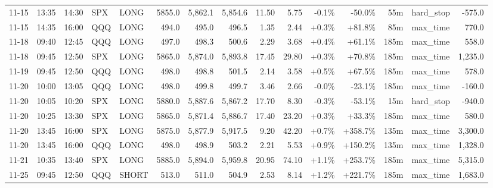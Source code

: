 \documentclass[11pt,a4paper,twoside]{article}
\begin{document}
\begin{landscape}
\begin{center}
\begin{longtable}{>{\color{txtmain}}l l l l l r r r r r r r r >{\color{txtmain}}l r}
11-15 & 13:35 & 14:30 & SPX & LONG & 5855.0 & 5,862.1 & 5,854.6 & 11.50 & 5.75 & \textcolor{lossred}{-0.1\%} & \textcolor{lossred}{-50.0\%} & 55m & hard\_stop & \textcolor{lossred}{-575.0} \\
11-15 & 14:35 & 16:00 & QQQ & LONG & 494.0 & 495.0 & 496.5 & 1.35 & 2.44 & \textcolor{wingreen}{+0.3\%} & \textcolor{wingreen}{+81.8\%} & 85m & max\_time & \textcolor{wingreen}{770.0} \\
11-18 & 09:40 & 12:45 & QQQ & LONG & 497.0 & 498.3 & 500.6 & 2.29 & 3.68 & \textcolor{wingreen}{+0.4\%} & \textcolor{wingreen}{+61.1\%} & 185m & max\_time & \textcolor{wingreen}{558.0} \\
11-18 & 09:45 & 12:50 & SPX & LONG & 5865.0 & 5,874.0 & 5,893.8 & 17.45 & 29.80 & \textcolor{wingreen}{+0.3\%} & \textcolor{wingreen}{+70.8\%} & 185m & max\_time & \textcolor{wingreen}{1,235.0} \\
11-19 & 09:45 & 12:50 & QQQ & LONG & 498.0 & 498.8 & 501.5 & 2.14 & 3.58 & \textcolor{wingreen}{+0.5\%} & \textcolor{wingreen}{+67.5\%} & 185m & max\_time & \textcolor{wingreen}{578.0} \\
11-20 & 10:00 & 13:05 & QQQ & LONG & 498.0 & 499.8 & 499.7 & 3.46 & 2.66 & \textcolor{lossred}{-0.0\%} & \textcolor{lossred}{-23.1\%} & 185m & max\_time & \textcolor{lossred}{-160.0} \\
11-20 & 10:05 & 10:20 & SPX & LONG & 5880.0 & 5,887.6 & 5,867.2 & 17.70 & 8.30 & \textcolor{lossred}{-0.3\%} & \textcolor{lossred}{-53.1\%} & 15m & hard\_stop & \textcolor{lossred}{-940.0} \\
11-20 & 10:25 & 13:30 & SPX & LONG & 5865.0 & 5,871.4 & 5,886.7 & 17.40 & 23.20 & \textcolor{wingreen}{+0.3\%} & \textcolor{wingreen}{+33.3\%} & 185m & max\_time & \textcolor{wingreen}{580.0} \\
11-20 & 13:45 & 16:00 & SPX & LONG & 5875.0 & 5,877.9 & 5,917.5 & 9.20 & 42.20 & \textcolor{wingreen}{+0.7\%} & \textcolor{wingreen}{+358.7\%} & 135m & max\_time & \textcolor{wingreen}{3,300.0} \\
11-20 & 13:45 & 16:00 & QQQ & LONG & 498.0 & 498.9 & 503.2 & 2.21 & 5.53 & \textcolor{wingreen}{+0.9\%} & \textcolor{wingreen}{+150.2\%} & 135m & max\_time & \textcolor{wingreen}{1,328.0} \\
11-21 & 10:35 & 13:40 & SPX & LONG & 5885.0 & 5,894.0 & 5,959.8 & 20.95 & 74.10 & \textcolor{wingreen}{+1.1\%} & \textcolor{wingreen}{+253.7\%} & 185m & max\_time & \textcolor{wingreen}{5,315.0} \\
11-25 & 09:45 & 12:50 & QQQ & SHORT & 513.0 & 511.0 & 504.9 & 2.53 & 8.14 & \textcolor{wingreen}{+1.2\%} & \textcolor{wingreen}{+221.7\%} & 185m & max\_time & \textcolor{wingreen}{1,683.0} \\

\end{longtable}
\end{center}
\end{landscape}
\end{document}
